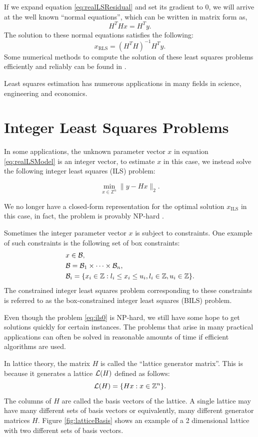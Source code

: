 \documentclass[12pt,Bold,letterpaper]{mcgilletdclass}
\newcommand{\be}{\begin{equation}}
\newcommand{\ee}{\end{equation}}
\newcommand{\boxcon}{{\cal B}}
\newcommand{\vsp}{\vspace{\baselineskip}}
\begin{document}
If we expand equation \eqref{eq:realLSResidual} and set its gradient to $0$, we will arrive at the
well known ``normal equations'', which can be written in matrix form as,
\begin{equation}
H^THx = H^Ty.
\label{eq:normalEquations}
\end{equation}
The solution to these normal equations satisfies the following:
$$x_{\scriptscriptstyle{\mathrm{RLS}}} = (H^TH)^{-1}H^Ty.$$
Some numerical methods to compute the solution of these least squares problems efficiently and reliably can be found in \cite{Bjo96}.

Least squares estimation has numerous applications in many fields in science, engineering and economics.

\vsp \section{Integer Least Squares Problems}
In some applications, the unknown parameter vector $x$ in equation \eqref{eq:realLSModel} is an integer vector, to estimate $x$ in this case, we instead solve the following integer least squares (ILS) problem:

\be
\label{eq:ils0}
\min_{x \in {\mathbb{Z}}^n}  \| y- Hx \|_2. 
\ee

We no longer have a closed-form representation for the optimal solution $x_{\scriptscriptstyle{\mathrm{ILS}}}$ in this case, in fact, the
problem is provably NP-hard \cite{Mic01}.  

Sometimes the integer parameter vector $x$ is subject to constraints. One example of such constraints is the following set of box constraints:
\begin{align} \label{eq:boxCon}
&x\in \boxcon,\\
&{\cal B} = {\cal B}_1  \times \cdots \times {\cal B}_n,\\
&\boxcon_i = \{x_i\in\mathbb{Z} : l_i\le x_i \le u_i, l_i\in \mathbb{Z},
u_i\in\mathbb{Z} \}.
\end{align}
The constrained integer least squares problem corresponding to these constraints is referred to as the box-constrained integer least squares (BILS) problem. 

Even though the problem \eqref{eq:ils0} is NP-hard, we still have some hope to get solutions
quickly for certain instances. The problems that arise in many practical applications can often be solved in reasonable amounts of time if efficient algorithms are used.

In lattice theory, the matrix $H$ is called the ``lattice generator matrix''. This is because it generates a lattice ${\cal{L}}(H)$ defined as follows:
\begin{equation}
{\cal{L}}(H) = \{Hx: x\in \mathbb{Z}^n\}.
\end{equation}
The columns of $H$ are called the basis vectors of the lattice. A single lattice may have many different sets of basis vectors or equivalently, many different generator matrices $H$. Figure \ref{fig:latticeBasis} shows an example of a 2 dimensional lattice with two different sets of basis vectors.
\end{document}
